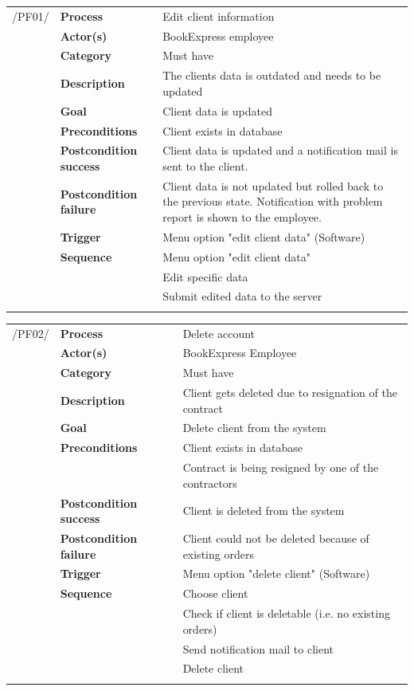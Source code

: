 \documentclass[11pt,a4paper,oneside,svgnames]{report}
\begin{document}
\noindent
\begin{tabular}{p{1.5cm}p{3cm}p{8cm}}
/PF01/	& \textbf{Process} & Edit client information\\
		& \textbf{Actor(s)} & BookExpress employee\\
		& \textbf{Category} & Must have\\
		& \textbf{Description}	 & The clients data is outdated and needs to be updated\\
		& \textbf{Goal} & Client data is updated\\
		& \textbf{Preconditions} & Client exists in database\\
		& \textbf{Postcondition success} & Client data is updated and a notification mail is sent to the client.\\
		& \textbf{Postcondition failure} & Client data is not updated but rolled back to the previous state. Notification with problem report is shown to the employee.\\
		& \textbf{Trigger} & Menu option "edit client data" (Software)\\
		& \textbf{Sequence} & Menu option "edit client data"\\
		& & Edit specific data\\
		& & Submit edited data to the server\\
\hfill \\
\end{tabular}

\noindent
\begin{tabular}{p{1.5cm}p{3cm}p{8cm}}
/PF02/	& \textbf{Process} & Delete account\\ 
		& \textbf{Actor(s)} & BookExpress Employee\\ 
		& \textbf{Category} & Must have\\
		& \textbf{Description}	 & Client gets deleted due to resignation of the contract\\ 
		& \textbf{Goal} & Delete client from the system\\
		& \textbf{Preconditions} & Client exists in database\\
		& & Contract is being resigned by one of the contractors\\
		& \textbf{Postcondition success} & Client is deleted from the system\\
		& \textbf{Postcondition failure} & Client could not be deleted because of existing orders\\
		& \textbf{Trigger} & Menu option "delete client" (Software)\\
		& \textbf{Sequence} & Choose client\\
		& & Check if client is deletable (i.e. no existing orders)\\
		& & Send notification mail to client\\
		& & Delete client\\
\hfill \\		
\end{tabular}
\end{document}
